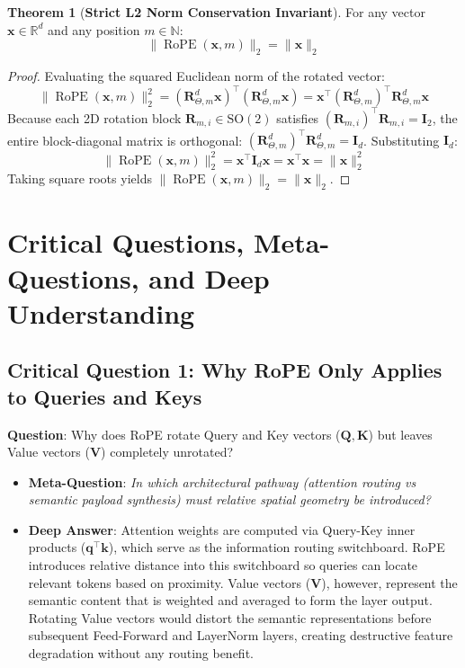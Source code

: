 \documentclass[11pt,a4paper]{article}
\theoremstyle{definition}
\newtheorem{theorem}{\textbf{Theorem}}[section]
\begin{document}
\begin{theorem}[\textbf{Strict L2 Norm Conservation Invariant}]
For any vector $\mathbf{x} \in \mathbb{R}^d$ and any position $m \in \mathbb{N}$:
{\boldmath
\begin{equation}
\|\operatorname{RoPE}(\mathbf{x}, m)\|_2 = \|\mathbf{x}\|_2
\end{equation}
}
\end{theorem}

\begin{proof}
Evaluating the squared Euclidean norm of the rotated vector:
{\boldmath
\begin{equation}
\|\operatorname{RoPE}(\mathbf{x}, m)\|_2^2 = (\mathbf{R}_{\Theta, m}^d \mathbf{x})^\top (\mathbf{R}_{\Theta, m}^d \mathbf{x}) = \mathbf{x}^\top (\mathbf{R}_{\Theta, m}^d)^\top \mathbf{R}_{\Theta, m}^d \mathbf{x}
\end{equation}
}
Because each 2D rotation block $\mathbf{R}_{m, i} \in \mathrm{SO}(2)$ satisfies $(\mathbf{R}_{m, i})^\top \mathbf{R}_{m, i} = \mathbf{I}_2$, the entire block-diagonal matrix is orthogonal:
$(\mathbf{R}_{\Theta, m}^d)^\top \mathbf{R}_{\Theta, m}^d = \mathbf{I}_d$.
Substituting $\mathbf{I}_d$:
{\boldmath
\begin{equation}
\|\operatorname{RoPE}(\mathbf{x}, m)\|_2^2 = \mathbf{x}^\top \mathbf{I}_d \mathbf{x} = \mathbf{x}^\top \mathbf{x} = \|\mathbf{x}\|_2^2
\end{equation}
}
Taking square roots yields $\|\operatorname{RoPE}(\mathbf{x}, m)\|_2 = \|\mathbf{x}\|_2$.
\end{proof}

\section{Critical Questions, Meta-Questions, and Deep Understanding}

\subsection{\textbf{Critical Question 1: Why RoPE Only Applies to Queries and Keys}}
\textbf{Question}: Why does RoPE rotate Query and Key vectors ($\mathbf{Q}, \mathbf{K}$) but leaves Value vectors ($\mathbf{V}$) completely unrotated?
\begin{itemize}
    \item \textbf{Meta-Question}: \emph{In which architectural pathway (attention routing vs semantic payload synthesis) must relative spatial geometry be introduced?}
    \item \textbf{Deep Answer}: Attention weights are computed via Query-Key inner products ($\mathbf{q}^\top \mathbf{k}$), which serve as the information routing switchboard. RoPE introduces relative distance into this switchboard so queries can locate relevant tokens based on proximity. Value vectors ($\mathbf{V}$), however, represent the semantic content that is weighted and averaged to form the layer output. Rotating Value vectors would distort the semantic representations before subsequent Feed-Forward and LayerNorm layers, creating destructive feature degradation without any routing benefit.
\end{itemize}
\end{document}
